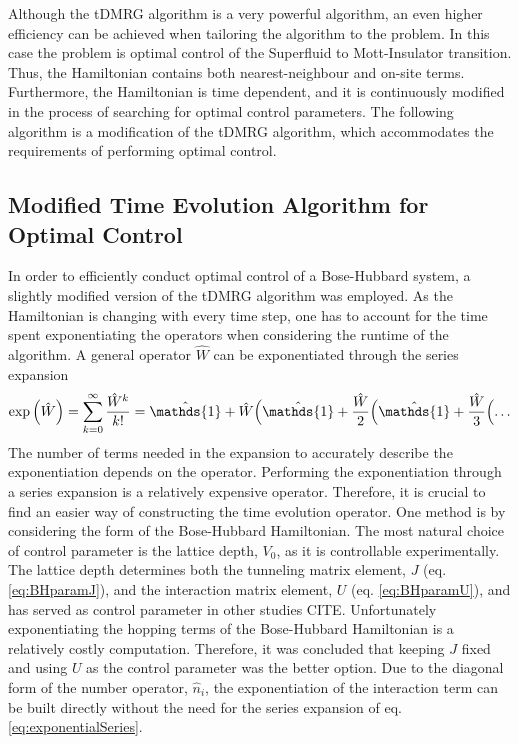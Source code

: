 Although the tDMRG algorithm is a very powerful algorithm, an even higher efficiency can be achieved when tailoring the algorithm to the problem. In this case the problem is optimal control of the Superfluid to Mott-Insulator transition. Thus, the Hamiltonian contains both nearest-neighbour and on-site terms. Furthermore, the Hamiltonian is time dependent, and it is continuously modified in the process of searching for optimal control parameters. The following algorithm is a modification of the tDMRG algorithm, which accommodates the requirements of performing optimal control.


\subsection{Modified Time Evolution Algorithm for Optimal Control}
\label{sec:modTMDRG}
In order to efficiently conduct optimal control of a Bose-Hubbard system, a slightly modified version of the tDMRG algorithm was employed. As the Hamiltonian is changing with every time step, one has to account for the time spent exponentiating the operators when considering the runtime of the algorithm. A general operator $\hat{W}$ can be exponentiated through the series expansion
\begin{equation}
	\exp \left( \hat{W} \right) = \sum_{k = 0}^{\infty} \frac{\hat{W}^k}{k!} = \hat{\mathds{1}} + \hat{W} \Bigl(  \hat{\mathds{1}} + \frac{\hat{W}}{2} \Bigl( \hat{\mathds{1}} + \frac{\hat{W}}{3} \Bigl( \ldots
\label{eq:exponentialSeries}
\end{equation}
The number of terms needed in the expansion to accurately describe the exponentiation depends on the operator. Performing the exponentiation through a series expansion is a relatively expensive operator. Therefore, it is crucial to find an easier way of constructing the time evolution operator.
One method is by considering the form of the Bose-Hubbard Hamiltonian. The most natural choice of control parameter is the lattice depth, $V_0$, as it is controllable experimentally. The lattice depth determines both the tunneling matrix element, $J$ (eq. \eqref{eq:BHparamJ}), and the interaction matrix element, $U$ (eq. \eqref{eq:BHparamU}), and has served as control parameter in other studies CITE.   
Unfortunately exponentiating the hopping terms of the Bose-Hubbard Hamiltonian is a relatively costly computation. Therefore, it was concluded that keeping $J$ fixed and using $U$ as the control parameter was the better option. Due to the diagonal form of the number operator, $\hat{n}_i$, the exponentiation of the interaction term can be built directly without the need for the series expansion of eq. \eqref{eq:exponentialSeries}.
